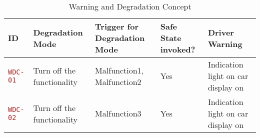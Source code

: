 \begin{table}[!htpb]
\caption{Warning and Degradation Concept}
\begin{center}
\scriptsize
\renewcommand{\arraystretch}{1.4}
\begin{tabular}{ L{1.8cm}|L{2.5cm}|L{4.2cm}|L{2.2cm}|L{2.2cm}  }
\hline
{}
ID &
Degradation Mode &
Trigger for Degradation Mode &
Safe State invoked? &
Driver Warning
\\\hline
\textcolor{brown}{\texttt{WDC-01}}  &
Turn off the functionality &
Malfunction1, Malfunction2 &
Yes  &
Indication light on car display on\\\hline
\textcolor{brown}{\texttt{WDC-02}}  &
Turn off the functionality  &
Malfunction3 &
Yes  &
Indication light on car display on\\\hline
\end{tabular}
\end{center}
\label{tab:wdc}
\end{table}


 
